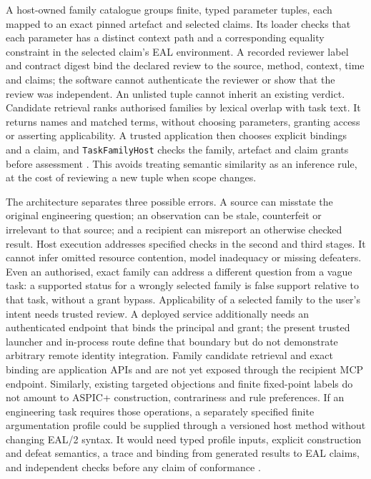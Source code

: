 \documentclass[preprint,12pt]{elsarticle}
\begin{document}
A host-owned family catalogue groups finite, typed parameter tuples, each mapped to an exact pinned artefact and selected claims. Its loader checks that each parameter has a distinct context path and a corresponding equality constraint in the selected claim's EAL environment. A recorded reviewer label and contract digest bind the declared review to the source, method, context, time and claims; the software cannot authenticate the reviewer or show that the review was independent. An unlisted tuple cannot inherit an existing verdict. Candidate retrieval ranks authorised families by lexical overlap with task text. It returns names and matched terms, without choosing parameters, granting access or asserting applicability. A trusted application then chooses explicit bindings and a claim, and \texttt{TaskFamilyHost} checks the family, artefact and claim grants before assessment \citep{earlFamilies,earlFamilyHost}. This avoids treating semantic similarity as an inference rule, at the cost of reviewing a new tuple when scope changes.

The architecture separates three possible errors. A source can misstate the original engineering question; an observation can be stale, counterfeit or irrelevant to that source; and a recipient can misreport an otherwise checked result. Host execution addresses specified checks in the second and third stages. It cannot infer omitted resource contention, model inadequacy or missing defeaters. Even an authorised, exact family can address a different question from a vague task: a supported status for a wrongly selected family is false support relative to that task, without a grant bypass. Applicability of a selected family to the user's intent needs trusted review. A deployed service additionally needs an authenticated endpoint that binds the principal and grant; the present trusted launcher and in-process route define that boundary but do not demonstrate arbitrary remote identity integration. Family candidate retrieval and exact binding are application APIs and are not yet exposed through the recipient MCP endpoint. Similarly, existing targeted objections and finite fixed-point labels do not amount to ASPIC+ construction, contrariness and rule preferences. If an engineering task requires those operations, a separately specified finite argumentation profile could be supplied through a versioned host method without changing EAL/2 syntax. It would need typed profile inputs, explicit construction and defeat semantics, a trace and binding from generated results to EAL claims, and independent checks before any claim of conformance \citep{modgil2014,earlArgument}.
\end{document}
